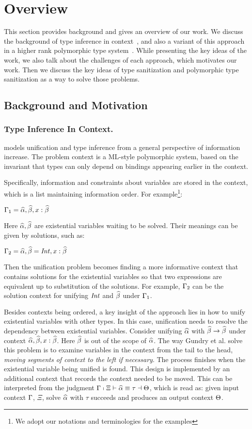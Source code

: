 \section{Overview}
\label{sec:overview}

This section provides background and gives an overview of our work. We discuss
the background of type inference in context~\citep{gundry2010type}, and also a
variant of this approach in a higher rank polymorphic type
system~\citep{dunfield2013complete}. While presenting the key ideas of the work,
we also talk about the challenges of each approach, which motivates our work.
Then we discuss the key ideas of type sanitization and polymorphic type
sanitization as a way to solve those problems.

\subsection{Background and Motivation}

\subsubsection{Type Inference In Context.}
\citet{gundry2010type} models unification and type inference from a general
perspective of information increase. The problem context is a ML-style
polymorphic system, based on the invariant that types can only depend on
bindings appearing earlier in the context.

Specifically, information and constraints about variables are stored in the
context, which is a list maintaining information order. For example\footnote{We
  adopt our notations and terminologies for the examples}:

$\Gamma_1 = \widehat{\alpha}, \widehat{\beta}, x :\widehat{\beta}$

Here $\widehat{\alpha}, \widehat{\beta}$ are existential variables waiting to be solved. Their
meanings can be given by solutions, such as:

$\Gamma_2 = \widehat{\alpha}, \widehat{\beta} = \mathit{Int}, x :\widehat{\beta}$

Then the unification problem becomes finding a more informative context that
contains solutions for the existential variables so that two expressions are
equivalent up to substitution of the solutions. For
example, $\Gamma_2$ can be the solution context for unifying
$\mathit{Int}$ and $\widehat{\beta}$ under $\Gamma_1$.

Besides contexts being ordered, a key insight of the approach lies in how to
unify existential variables with other types. In this case, unification needs to
resolve the dependency between existential variables. Consider unifying $\widehat{\alpha}$
with $\widehat{\beta} \to \widehat{\beta}$ under context $\widehat{\alpha}, \widehat{\beta}, x : \widehat{\beta}$. Here $\widehat{\beta}$ is
out of the scope of $\widehat{\alpha}$. The way Gundry et al. solve this problem is to examine variables in
the context from the tail to the head, \textit{moving segments of context to the
  left if necessary}. The process finishes when the existential variable being unified is found.
This design is implemented by an additional context that records the context
needed to be moved. This can be interpreted from the judgment $\Gamma \shortmid
\Xi \vdash \widehat{\alpha} \equiv \tau \dashv \Theta$, which is read as: given input context
$\Gamma$, $\Xi$, solve $\widehat{\alpha}$ with $\tau$ succeeds and produces an output
context $\Theta$.

